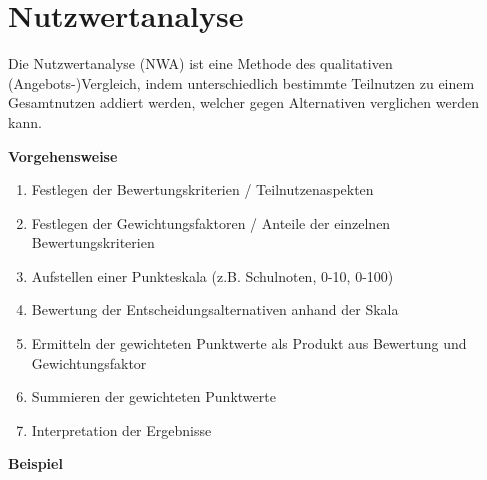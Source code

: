 \section{Nutzwertanalyse}
Die Nutzwertanalyse (NWA) ist eine Methode des qualitativen (Angebots-)Vergleich, indem unterschiedlich bestimmte Teilnutzen zu einem Gesamtnutzen addiert werden, welcher gegen Alternativen verglichen werden kann.

\textbf{Vorgehensweise}

\begin{enumerate}
    \item Festlegen der Bewertungskriterien / Teilnutzenaspekten
    \item Festlegen der Gewichtungsfaktoren / Anteile der einzelnen Bewertungskriterien
    \item Aufstellen einer Punkteskala (z.B. Schulnoten, 0-10, 0-100)
    \item Bewertung der Entscheidungsalternativen anhand der Skala
    \item Ermitteln der gewichteten Punktwerte als Produkt aus Bewertung und Gewichtungsfaktor
    \item Summieren der gewichteten Punktwerte
    \item Interpretation der Ergebnisse
\end{enumerate}

\textbf{Beispiel}


